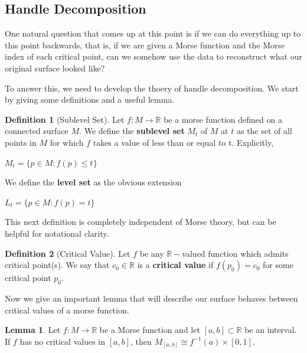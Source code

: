 \documentclass[12pt]{article}
\newcommand{\bR}{{\mathbb R}}
\theoremstyle{definition}
\newtheorem{definition}{Definition}
\newtheorem{lemma}{Lemma}
\begin{document}
\subsection{Handle Decomposition}

One natural question that comes up at this point is if we can do everything up to this point backwards, that is, if we are given a Morse function and the Morse index of each critical point, can we somehow use the data to reconstruct what our original surface looked like?

To answer this, we need to develop the thoery of handle decomposition. We start by giving some definitions and a useful lemma. 

\begin{definition}[Sublevel Set]
	Let $f:M\rightarrow \bR$ be a morse function defined on a connected surface $M$. We define the \textbf{sublevel set} $M_t$ of $M$ at $t$ as the set of all points in $M$ for which $f$ takes a value of less than or equal to t. Explicitly, 
	\begin{center}
		$M_t = \{p\in M: f(p)\leq t\}$
	\end{center}
	We define the \textbf{level set} as the obvious extension
	\begin{center}
		$L_t = \{p\in M: f(p)= t\}$
	\end{center}
\end{definition}

\noindent
This next definition is completely independent of Morse theory, but can be helpful for notational clarity. 

\begin{definition}[Critical Value]
	Let $f$ be any $\bR-$valued function which admits critical point(s). We say that $c_0 \in \bR$ is a \textbf{critical value} if $f(p_0) = c_0$ for some critical point $p_0$. 
\end{definition}
\noindent 
Now we give an important lemma that will describe our surface behaves between critical values of a morse function. 
\begin{lemma} Let $f:M\rightarrow \bR$ be a Morse function and let $[a,b]\subset \bR$ be an interval. If $f$ has no critical values in $[a,b]$, then $M_{[a,b]}\cong f^{-1}(a) \times [0,1]$. 
\end{lemma}
\end{document}
